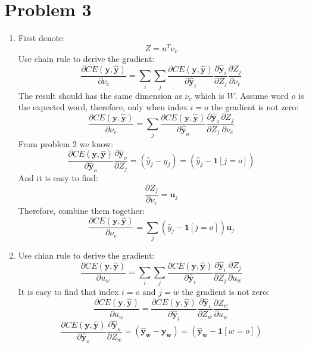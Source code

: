 \documentclass[10pt]{article}
\begin{document}
\section*{Problem 3}
\begin{enumerate}[label=(\alph*)]
\item
First denote:
\begin{equation*}
	Z = u^{T}\nu_c
\end{equation*}
Use chain rule to derive the gradient:
\begin{equation*}
	\frac{\partial CE(\mathbf{y}, \mathbf{\hat{y}})}{\partial \nu_c} = \sum_{i}\sum_{j}\frac{\partial CE(\mathbf{y}, \mathbf{\hat{y}})}{\partial \mathbf{\hat{y}}_i}\frac{\partial \mathbf{\hat{y}}_i}{\partial Z_j}\frac{\partial Z_j}{\partial \nu_c}
\end{equation*}
The result should has the same dimension as $\nu_c$ which is $W$. Assume word $o$ is the expected word, therefore, only when index $i = o$ the gradient is not zero:
\begin{equation*}
	\frac{\partial CE(\mathbf{y}, \mathbf{\hat{y}})}{\partial \nu_c} = \sum_{j}\frac{\partial CE(\mathbf{y}, \mathbf{\hat{y}})}{\partial \mathbf{\hat{y}}_o}\frac{\partial \mathbf{\hat{y}}_o}{\partial Z_j}\frac{\partial Z_j}{\partial \nu_c}
\end{equation*}
From problem 2 we know:
\begin{equation*}
	\frac{\partial CE(\mathbf{y}, \mathbf{\hat{y}})}{\partial \mathbf{\hat{y}}_o}\frac{\partial \mathbf{\hat{y}}_o}{\partial Z_j} = (\hat{y}_j - y_j) = (\hat{y}_j - \mathbf{1}[j=o])
\end{equation*}
And it is easy to find:
\begin{equation*}
	\frac{\partial Z_j}{\partial \nu_c} = \mathbf{u}_j
\end{equation*}
Therefore, combine them together:
\begin{equation*}
	\frac{\partial CE(\mathbf{y}, \mathbf{\hat{y}})}{\partial \nu_c} = \sum_j(\hat{y}_j - \mathbf{1}[j=o])\mathbf{u}_j
\end{equation*}

\item
Use chian rule to derive the gradient:
\begin{equation*}
	\frac{\partial CE(\mathbf{y}, \mathbf{\hat{y}})}{\partial u_w} = \sum_{i}\sum_{j}\frac{\partial CE(\mathbf{y}, \mathbf{\hat{y}})}{\partial \mathbf{\hat{y}}_i}\frac{\partial \mathbf{\hat{y}}_i}{\partial Z_j}\frac{\partial Z_j}{\partial u_w}
\end{equation*}
It is easy to find that index $i=o$ and $j=w$ the gradient is not zero:
\begin{equation*}
	\frac{\partial CE(\mathbf{y}, \mathbf{\hat{y}})}{\partial u_w} = \frac{\partial CE(\mathbf{y}, \mathbf{\hat{y}})}{\partial \mathbf{\hat{y}}_i}\frac{\partial \mathbf{\hat{y}}_i}{\partial Z_w}\frac{\partial Z_w}{\partial u_w}
\end{equation*}
\begin{equation*}
	\frac{\partial CE(\mathbf{y}, \mathbf{\hat{y}})}{\partial \mathbf{\hat{y}}_o}\frac{\partial \mathbf{\hat{y}}_o}{\partial Z_w} = (\mathbf{\hat{y}_w} - \mathbf{y_w}) = (\mathbf{\hat{y}_w} - \mathbf{1}[w=o])
\end{equation*}


\end{enumerate}
\end{document}
